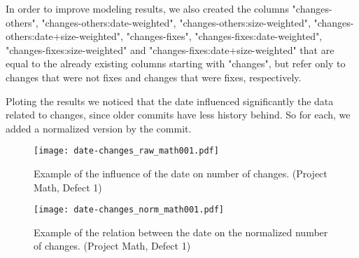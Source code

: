 
In order to improve modeling results, we also created the columns "changes-others", "changes-others:date-weighted", "changes-others:size-weighted", "changes-others:date+size-weighted", 
"changes-fixes", "changes-fixes:date-weighted", "changes-fixes:size-weighted" and "changes-fixes:date+size-weighted" that are equal to the already existing columns starting with
"changes", but refer only to changes that were not fixes and changes that were fixes, respectively.

Ploting the results we noticed that the date influenced significantly the data related to changes, since older commits have less history behind. 
So for each, we added a normalized version by the commit.

\begin{figure}[H]
  \begin{center}
    \leavevmode
    \texttt{[image: date-changes\_raw\_math001.pdf]}
    \caption{Example of the influence of the date on number of changes. (Project Math, Defect 1)}
    \label{fig:date-changes.raw}
  \end{center}
\end{figure}

\begin{figure}[H]
  \begin{center}
    \leavevmode
    \texttt{[image: date-changes\_norm\_math001.pdf]}
    \caption{Example of the relation between the date on the normalized number of changes. (Project Math, Defect 1)}
    \label{fig:date-changes.norm}
  \end{center}
\end{figure}

